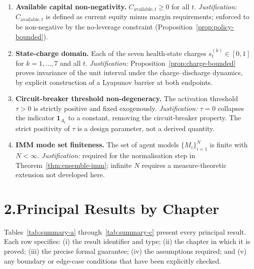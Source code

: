 \documentclass[12pt,openany]{book}
\numberwithin{equation}{chapter}
\theoremstyle{plain}
\theoremstyle{definition}
\theoremstyle{remark}
\def\mathcal#1{#1}%
\begin{document}
\begin{enumerate}
  \item \textbf{Available capital non-negativity.}
        $C_{\mathrm{available},t} \ge 0$ for all $t$.
        \emph{Justification:} $C_{\mathrm{available},t}$ is defined as
        current equity minus margin requirements; enforced to be
        non-negative by the no-leverage constraint
        (Proposition~\ref{prop:policy-bounded}).

  \item \textbf{State-charge domain.}
        Each of the seven health-state charges
        $s^{(k)}_t \in [0,1]$ for $k = 1,\ldots,7$ and all $t$.
        \emph{Justification:} Proposition~\ref{prop:charge-bounded}
        proves invariance of the unit interval under the charge--dis\-charge
        dynamics, by explicit construction of a Lyapunov barrier at
        both endpoints.

  \item \textbf{Circuit-breaker threshold non-degeneracy.}
        The activation threshold $\tau > 0$ is strictly positive and
        fixed exogenously.
        \emph{Justification:} $\tau = 0$ collapses the indicator
        $\mathbf{1}_{\mathcal{A}_t}$ to a constant, removing the
        circuit-breaker property.  The strict positivity of $\tau$
        is a design parameter, not a derived quantity.

  \item \textbf{IMM mode set finiteness.}
        The set of agent models $\{\mathcal{M}_i\}_{i=1}^N$ is finite
        with $N < \infty$.
        \emph{Justification:} required for the normalisation step in
        Theorem~\ref{thm:ensemble-imm}; infinite $N$ requires a
        measure-theoretic extension not developed here.

\end{enumerate}

\section*{2.\enspace Principal Results by Chapter}

\noindent
Tables~\ref{tab:summary-a} through~\ref{tab:summary-c} present every
principal result.  Each row specifies: (i) the result identifier and
type; (ii) the chapter in which it is proved; (iii) the precise
formal guarantee; (iv) the assumptions required; and (v) any
boundary or edge-case conditions that have been explicitly checked.
\end{document}
